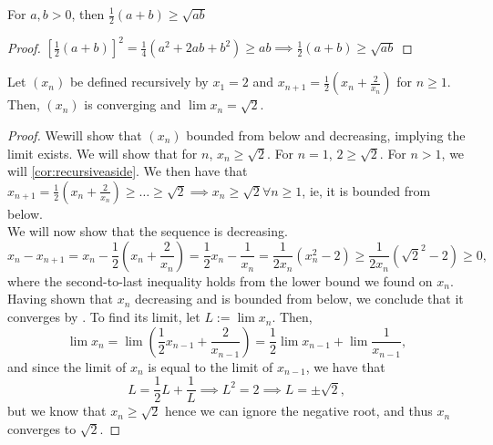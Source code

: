 \documentclass[12pt]{article}
\begin{document}

\begin{corollary}\label{cor:recursiveaside}
  For $a,b > 0$, then $\frac{1}{2}(a+b) \geq \sqrt{ab}$
\end{corollary}
\begin{proof}
  $\left[\frac{1}{2}(a+b)\right]^2 = \frac{1}{4}(a^2 + 2ab + b^2) \geq ab \implies \frac{1}{2}(a+b)\geq \sqrt{ab}$
\end{proof}

\begin{example}
  Let $(x_n)$ be defined recursively by $x_1 = 2$ and $x_{n+1} = \frac{1}{2}\left(x_n + \frac{2}{x_n}\right)$ for $n \geq 1$. Then, $(x_n)$ is converging and $\lim x_n = \sqrt{2}$.
  \begin{proof}
    We\footnotemark  will show that $(x_n)$ bounded from below and decreasing, implying the limit exists. We will show that for $n$, $x_n \geq \sqrt{2}$. For $n = 1$, $2 \geq \sqrt{2}$. For $n > 1$, we will \cref{cor:recursiveaside}. We then have that $x_{n+1} = \frac{1}{2}(x_n + \frac{2}{x_n}) \geq \dots \geq \sqrt{2} \implies x_n \geq \sqrt{2} \forall n \geq 1$, ie, it is bounded from below.\\
    We will now show that the sequence is decreasing.
    \[x_n - x_{n+1} = x_n - \frac{1}{2}(x_n + \frac{2}{x_n}) = \frac{1}{2}x_n - \frac{1}{x_n} = \frac{1}{2x_n}(x_n^2 - 2) \geq \frac{1}{2x_n}(\sqrt{2}^2 - 2) \geq 0,\]
    where the second-to-last inequality holds from the lower bound we found on $x_n$. Having shown that $x_n$ decreasing and is bounded from below, we conclude that it converges by . To find its limit, let $L := \lim x_n$. Then, \[
      \lim x_{n} = \lim \left(\frac{1}{2}x_{n-1} + \frac{2}{x_{n-1}}\right) = \frac{1}{2}\lim x_{n-1} + \lim \frac{1}{x_{n-1}},
    \]
    and since the limit of $x_n$ is equal to the limit of $x_{n-1}$, we have that \[
    L = \frac{1}{2} L + \frac{1}{L} \implies L^2 = 2 \implies L = \pm\sqrt{2},
    \]
    but we know that $x_n \geq \sqrt{2}$ hence we can ignore the negative root, and thus $x_n$ converges to $\sqrt{2}$.
  \end{proof}
\end{example}

\end{document}
